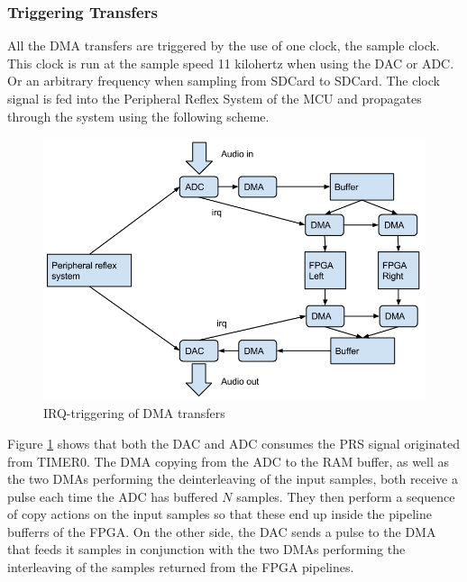 \subsubsection{Triggering Transfers}

All the DMA transfers are triggered by the use of one clock, the sample clock.
This clock is run at the sample speed 11 kilohertz when using the DAC or ADC. Or
an arbitrary frequency when sampling from SDCard to SDCard. The clock signal is fed into
the Peripheral Reflex System \cite{prs} of the MCU and propagates
through the system using the following scheme.

\begin{figure}[H]
    \centering
    \includegraphics[width=1\textwidth]{figures/sw/dma-paths.png}
    \caption{IRQ-triggering of DMA transfers}
    \label{fig:irq-triggering}
\end{figure}

Figure \ref{fig:irq-triggering} shows that both the DAC and ADC consumes the PRS signal originated from TIMER0. The
DMA copying from the ADC to the RAM buffer, as well as the two DMAs performing the
deinterleaving of the input samples, both receive a pulse each time the ADC has
buffered $N$ samples. They then perform a sequence of copy actions on the input
samples so that these end up inside the pipeline bufferrs of the FPGA. On the
other side, the DAC sends a pulse to the DMA that feeds it samples in conjunction
with the two DMAs performing the interleaving of the samples returned from the
FPGA pipelines.
